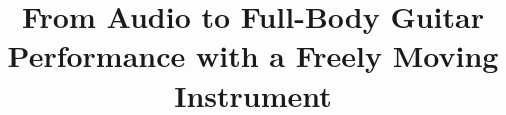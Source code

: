 \documentclass[acmtog,anonymous,review]{acmart}
\begin{document}
\title{From Audio to Full-Body Guitar Performance with a Freely Moving Instrument}

\begin{abstract}
\end{abstract}

\maketitle


\end{document}

